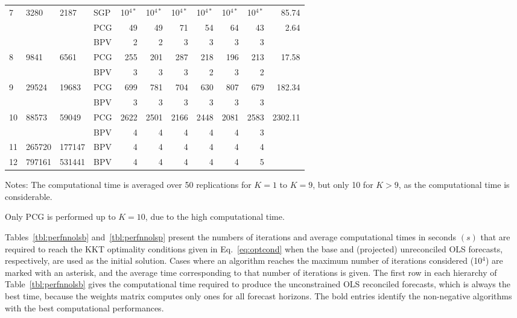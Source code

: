 \documentclass[11pt]{article}
\newcommand{\0}{\phantom{0}}
\begin{document}
\begin{table}[ht]
\begin{threeparttable}
\begin{tabular}{llllrrrrrrr}
			\midrule
			7 & 3280 & 2187 & SGP & 10$^{4*}$ & 10$^{4*}$ & 10$^{4*}$ & 10$^{4*}$ & 10$^{4*}$ & 10$^{4*}$ & 85.74\\
			& & & PCG & 49 & 49 & 71 & 54 & 64 & 43 & 2.64 \\
			& & & BPV & 2 & 2 & 3 & 3 & 3 & 3 & \bm{$0.31$} \\
			\midrule
			8 & 9841 & 6561 & PCG & 255 & 201 & 287 & 218 & 196 & 213 & 17.58 \\
			& & & BPV & 3 & 3 & 3 & 2 & 3 & 2 & \bm{$1.13$} \\
			\midrule
			9 & 29524 & 19683 & PCG & 699 & 781 & 704 & 630 & 807 & 679 & 182.34 \\
			& & & BPV & 3 & 3 & 3 & 3 & 3 & 3 & \bm{$2.80$} \\
			\midrule
			10 & 88573 & 59049 & PCG & 2622 & 2501 & 2166 & 2448 & 2081 & 2583 & 2302.11 \\
			& & & BPV & 4 & 4 & 4 & 4 & 4 & 3 & \bm{$9.33$} \\
			\midrule
			11 & 265720 & 177147 & BPV & 4 & 4 & 4 & 4 & 4 & 4 & \bm{$28.99$}\\
			\midrule
			12 & 797161 & 531441 & BPV & 4 & 4 & 4 & 4 & 4 & 5 & \bm{$98.57$}\\
			\bottomrule
		\end{tabular}
		\begin{tablenotes}
			\item [] Notes: The computational time is averaged over 50 replications for $K = 1$ to $K = 9$, but only 10 for $K > 9$, as the computational time is considerable.
			\item [] Only PCG is performed up to $K = 10$, due to the high computational time.
		\end{tablenotes}
	\end{threeparttable}
\end{table}


Tables~\ref{tbl:perfnnolsb} and~\ref{tbl:perfnnolsp} present the numbers of iterations and average computational times in seconds $(s)$ that are required to reach the KKT optimality conditions given in Eq.~\eqref{eq:optcond} when the base and (projected) unreconciled OLS forecasts, respectively, are used as the initial solution. Cases where an algorithm reaches the maximum number of iterations considered (10$^{4}$) are marked with an asterisk, and the average time corresponding to that number of iterations is given. The first row in each hierarchy of Table~\ref{tbl:perfnnolsb} gives the computational time required to produce the unconstrained OLS reconciled forecasts, which is always the best time, because the weights matrix computes only ones for all forecast horizons. The bold entries identify the non-negative algorithms with the best computational performances.
\end{document}
